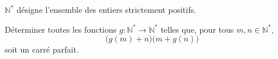 $\mathbb{N}^*$ désigne l'ensemble des entiers strictement positifs.

Déterminer toutes les fonctions $g : \mathbb{N}^* \to \mathbb{N}^*$ telles que, pour tous
$m, n \in \mathbb{N}^*$,
\[
\bigl(g(m) + n\bigr)\bigl(m + g(n)\bigr)
\]
soit un carré parfait.

